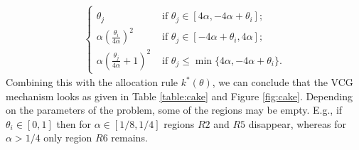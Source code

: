 \documentclass[a4paper]{article}
\begin{document}
\begin{enumerate}
\begin{align*}
\begin{cases}
				\\
				\theta_j
				& \text{ if } \theta_j \in [4 \alpha, -4 \alpha + \theta_i];
				\\
				\alpha \left( \frac{\theta_i}{4\alpha}\right)^2
				& \text{ if } \theta_j \in [-4 \alpha + \theta_i, 4 \alpha];
				\\
				\alpha \left( \frac{\theta_j}{4\alpha} + 1 \right)^2
				& \text{ if } \theta_j \leq \min \{4 \alpha, -4 \alpha + \theta_i\}.
			\end{cases}
		\end{align*}
		Combining this with the allocation rule $k^*(\theta)$, we can conclude that the VCG mechanism looks as given in Table \ref{table:cake} and Figure \ref{fig:cake}. Depending on the parameters of the problem, some of the regions may be empty. E.g., if $\theta_i\in[0,1]$ then for $\alpha \in [1/8,1/4]$ regions $R2$ and $R5$ disappear, whereas for $\alpha > 1/4$ only region $R6$ remains.
		

\end{enumerate}
\end{document}

